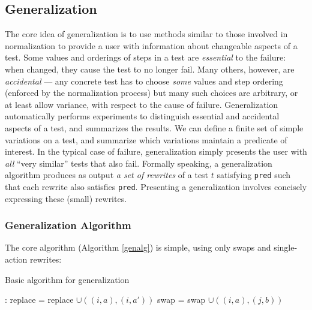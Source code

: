 



\subsection{Generalization}



The core idea of generalization is to use methods similar to those
involved in normalization to provide a user with information about
changeable aspects of a test.  Some values and orderings of steps
in a test are \emph{essential} to the failure: when changed, they
cause the test to no longer fail.  Many others, however, are
\emph{accidental} --- any concrete test has to choose \emph{some}
values and step ordering (enforced by the normalization
process) but many such choices are arbitrary, or at least allow
variance, with respect to the cause of failure.  Generalization
automatically performs experiments to distinguish essential and accidental aspects
of a test, and summarizes the results.  We
can define a finite set of simple variations on a test, and summarize which
variations maintain a predicate of interest. In the typical case of
failure, generalization simply presents the user with \emph{all}
``very similar'' tests that also fail. Formally
speaking, a generalization algorithm produces as output \emph{a set of
  rewrites} of a test $t$ satisfying {\tt pred} such that each rewrite
also satisfies {\tt pred}.  Presenting a generalization involves
concisely expressing these (small) rewrites.

\subsubsection{Generalization Algorithm}

The core algorithm
(Algorithm \ref{genalg}) is simple, using only swaps and single-action
rewrites:

\begin{algorithm}
\caption{Basic algorithm for generalization}
\label{genalg}
{\scriptsize
\begin{algorithmic}[1]
:
\State replace = replace $\cup ((i,a),(i,a'))$
\EndIf
\EndFor 
{}
\State swap = swap $\cup ((i,a),(j,b))$
\EndIf
\EndFor
\EndFor
{}
\end{algorithmic}
}
\end{algorithm}

